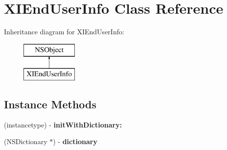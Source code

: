 \hypertarget{class_x_i_end_user_info}{}\section{X\+I\+End\+User\+Info Class Reference}
\label{class_x_i_end_user_info}
Inheritance diagram for X\+I\+End\+User\+Info\+:\begin{figure}[H]
\begin{center}
\leavevmode
\includegraphics[height=2.000000cm]{class_x_i_end_user_info}
\end{center}
\end{figure}
\subsection*{Instance Methods}
\begin{DoxyCompactItemize}
\item 
\hypertarget{class_x_i_end_user_info_abfca85fbd7a78022ee82a3f9bbade3bb}{}\label{class_x_i_end_user_info_abfca85fbd7a78022ee82a3f9bbade3bb} 
(instancetype) -\/ {\bfseries init\+With\+Dictionary\+:}
\item 
\hypertarget{class_x_i_end_user_info_a2cf8fe403d497eda4cacb42041954a93}{}\label{class_x_i_end_user_info_a2cf8fe403d497eda4cacb42041954a93} 
(N\+S\+Dictionary $\ast$) -\/ {\bfseries dictionary}
\end{DoxyCompactItemize}
